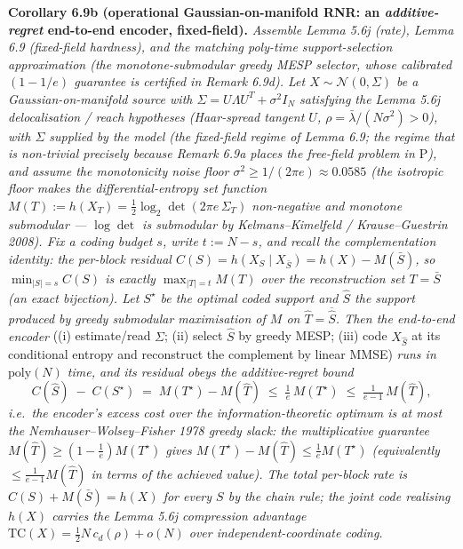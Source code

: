 \documentclass[
]{article}
\begin{document}
\textbf{Corollary 6.9b (operational Gaussian-on-manifold RNR: an
\emph{additive-regret} end-to-end encoder, fixed-field).} \emph{Assemble Lemma
5.6j (rate), Lemma 6.9 (fixed-field hardness), and the matching poly-time
support-selection approximation (the monotone-submodular greedy MESP selector,
whose calibrated $(1-1/e)$ guarantee is certified in Remark 6.9d). Let $X\sim\mathcal N(0,\Sigma)$ be a Gaussian-on-manifold
source with $\Sigma=U\Lambda U^T+\sigma^2 I_N$ satisfying the Lemma 5.6j
delocalisation / reach hypotheses (Haar-spread tangent $U$,
$\rho=\bar\lambda/(N\sigma^2)>0$), with $\Sigma$ supplied by the model (the
fixed-field regime of Lemma 6.9; the regime that is non-trivial precisely
because Remark 6.9a places the \emph{free}-field problem in $\mathrm P$), and
assume the monotonicity noise floor $\sigma^2\ge 1/(2\pi e)\approx 0.0585$ (the
isotropic floor makes the differential-entropy set function $M(T):=h(X_T)=
\tfrac12\log_2\det(2\pi e\,\Sigma_T)$ non-negative and monotone submodular ---
$\log\det$ is submodular by Kelmans--Kimelfeld / Krause--Guestrin 2008). Fix a
coding budget $s$, write $t:=N-s$, and recall the complementation identity: the
per-block residual $C(S)=h(X_S\mid X_{\bar S})=h(X)-M(\bar S)$, so
$\min_{|S|=s}C(S)$ is exactly $\max_{|T|=t}M(T)$ over the reconstruction set
$T=\bar S$ (an exact bijection). Let $S^\star$ be the optimal coded support and
$\widehat S$ the support produced by greedy submodular maximisation of $M$ on
$\widehat T=\overline{\widehat S}$. Then the end-to-end encoder} ((i)
estimate/read $\Sigma$; (ii) select $\widehat S$ by greedy MESP; (iii) code
$X_{\widehat S}$ at its conditional entropy and reconstruct the complement by
linear MMSE) \emph{runs in $\mathrm{poly}(N)$ time, and its residual obeys the
\emph{additive-regret} bound}
\[
C(\widehat S)\;-\;C(S^\star)\;=\;M(T^\star)-M(\widehat T)\;\le\;
\tfrac1e\,M(T^\star)\;\le\;\tfrac1{e-1}\,M(\widehat T),
\tag{6.9b.1}
\]
\emph{i.e.\ the encoder's excess cost over the information-theoretic optimum is
at most the Nemhauser--Wolsey--Fisher 1978 greedy slack: the multiplicative
guarantee $M(\widehat T)\ge(1-\tfrac1e)M(T^\star)$ gives $M(T^\star)-M(\widehat
T)\le\tfrac1e M(T^\star)$ (equivalently $\le\tfrac1{e-1}M(\widehat T)$ in terms
of the achieved value). The total per-block rate is
$C(S)+M(\bar S)=h(X)$ for every $S$ by the chain rule; the joint code realising
$h(X)$ carries the Lemma 5.6j compression advantage $\mathrm{TC}(X)=\tfrac12
N\,c_d(\rho)+o(N)$ over independent-coordinate coding.}
\end{document}
